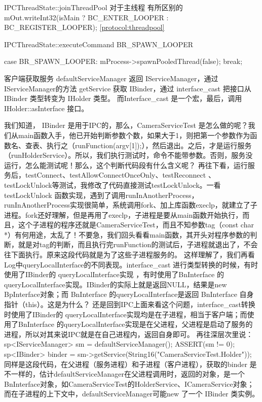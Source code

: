 \documentclass[a4paper,11pt]{article}
\begin{document}

IPCThreadState::joinThreadPool 对于主线程 有所区别的
 mOut.writeInt32(isMain ? BC_ENTER_LOOPER : BC_REGISTER_LOOPER);
\ref{protocol:threadpool}

IPCThreadState::executeCommand  BR_SPAWN_LOOPER 

case BR_SPAWN_LOOPER:
        mProcess->spawnPooledThread(false);
        break;


客户端获取服务
defaultServiceManager  返回 IServiceManager，通过 IServiceManager的方法 getService 获取 IBinder，通过 interface_cast 把接口从 IBinder 类型转变为 IHolder 类型。
而Interface_cast 是一个宏，最后，调用 IHolder::asInterface 接口。

我们知道， IBinder 是用于IPC的，那么，CameraServiceTest 是怎么做的呢？我们从main函数入手，他已开始判断参数个数，如果大于1，则把第一个参数作为函数名、查表、执行之（runFunction(argv[1]);），然后退出。之后，才是运行服务 （runHolderService）。所以，我们执行测试时，命令不能带参数。否则，服务没运行，怎么能测试呢！那么，这个判断代码段有什么含义呢？
再往下看，运行服务后，testConnect、testAllowConnectOnceOnly、testReconnect 、testLockUnlock等测试，我修改了代码直接测试testLockUnlock。一看testLockUnlock 函数实现，遇到了调用runInAnotherProcess，runInAnotherProcess实现很简单，系统调用fork、加上库函数execlp，就建立了子进程。fork还好理解，但是再用了execlp，子进程是要从main函数开始执行，而且，这个子进程的程序还就是CameraServiceTest，而且不知参数tag（const char *）有何用途，太乱了！不要急，我们回头看看main函数，其开头对程序参数的判断，就是对tag的判断，而且执行完runFunction的测试后，子进程就退出了，不会往下面执行。原来这段代码就是为了这些子进程服务的。
这样理解了，我们再看Log中queryLocalInterface的不同表现。interface_cast 进行类型转换的时候，有时使用了IBinder的 queryLocalInterface实现 ，有时使用了BnInterface 的queryLocalInterface实现。IBinder的实际上就是返回NULL，结果是new BpInterface对象；而
BnInterface 的queryLocalInterface是返回 BnInterface 自身指针（this）。这是为什么？ 还是回到IPC上面来看这个问题，interface_cast转换时使用了IBinder的 queryLocalInterface实现均是在子进程，相当于客户端；而使用了BnInterface 的queryLocalInterface实现是在父进程，父进程是启动了服务的进程，所以对其来说IPC就是在自己进程内，返回自身即可。
再往深层次里说：
    sp<IServiceManager> sm = defaultServiceManager();
    ASSERT(sm != 0);
    sp<IBinder> binder = sm->getService(String16("CameraServiceTest.Holder"));
同样是这段代码，在父进程（服务进程）和子进程（客户进程），获取的binder 是不一样的，估计defaultServiceManager在父进程调用时，返回的对象，是一个 BnInterface对象，如CameraServiceTest的HolderService、ICameraService对象；而在子进程的上下文中，defaultServiceManager可能new 了一个 IBinder 类实例。
\end{document}
